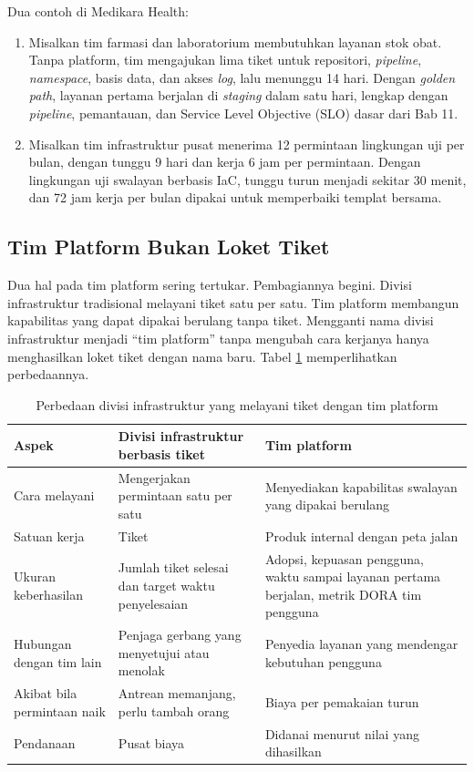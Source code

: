 Dua contoh di Medikara Health:
\begin{enumerate}
  \item Misalkan tim farmasi dan laboratorium membutuhkan layanan stok obat. Tanpa platform, tim
        mengajukan lima tiket untuk repositori, \textit{pipeline}, \textit{namespace}, basis data,
        dan akses \textit{log}, lalu menunggu 14 hari. Dengan \textit{golden path}, layanan
        pertama berjalan di \textit{staging} dalam satu hari, lengkap dengan \textit{pipeline},
        pemantauan, dan Service Level Objective (SLO) dasar dari Bab 11.
  \item Misalkan tim infrastruktur pusat menerima 12 permintaan lingkungan uji per bulan, dengan
        tunggu 9 hari dan kerja 6 jam per permintaan. Dengan lingkungan uji swalayan berbasis
        IaC, tunggu turun menjadi sekitar 30 menit, dan 72 jam kerja per bulan dipakai untuk
        memperbaiki templat bersama.
\end{enumerate}

\subsection{Tim Platform Bukan Loket Tiket}

Dua hal pada tim platform sering tertukar. Pembagiannya begini. Divisi infrastruktur tradisional
melayani tiket satu per satu. Tim platform membangun kapabilitas yang dapat dipakai berulang tanpa
tiket. Mengganti nama divisi infrastruktur menjadi ``tim platform'' tanpa mengubah cara kerjanya
hanya menghasilkan loket tiket dengan nama baru. Tabel \ref{tab:ch13-platform-tiket} memperlihatkan
perbedaannya.

\begin{table}[!htb]
  \centering
  \caption{Perbedaan divisi infrastruktur yang melayani tiket dengan tim platform}
  \label{tab:ch13-platform-tiket}
  \footnotesize
  \begin{tabularx}{\textwidth}{>{\raggedright\arraybackslash}p{2.8cm} >{\raggedright\arraybackslash}X >{\raggedright\arraybackslash}X}
    \hline
    \textbf{Aspek} & \textbf{Divisi infrastruktur berbasis tiket} & \textbf{Tim platform} \\
      \hline
    Cara melayani & Mengerjakan permintaan satu per satu & Menyediakan kapabilitas swalayan
      yang dipakai berulang \\ \hline
    Satuan kerja & Tiket & Produk internal dengan peta jalan \\ \hline
    Ukuran keberhasilan & Jumlah tiket selesai dan target waktu penyelesaian & Adopsi, kepuasan
      pengguna, waktu sampai layanan pertama berjalan, metrik DORA tim pengguna \\ \hline
    Hubungan dengan tim lain & Penjaga gerbang yang menyetujui atau menolak & Penyedia layanan
      yang mendengar kebutuhan pengguna \\ \hline
    Akibat bila permintaan naik & Antrean memanjang, perlu tambah orang & Biaya per pemakaian
      turun \\ \hline
    Pendanaan & Pusat biaya & Didanai menurut nilai yang dihasilkan \\ \hline
  \end{tabularx}
\end{table}

